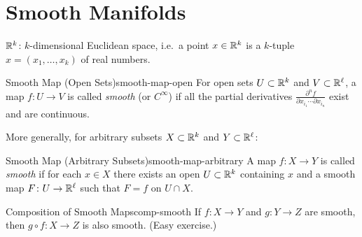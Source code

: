 
\section{Smooth Manifolds}

$\mathbb{R}^k$: $k$-dimensional Euclidean space, i.e.\ a point $x \in \mathbb{R}^k$ is a $k$-tuple $x = (x_1, \ldots, x_k)$ of real numbers.

\begin{definition}{Smooth Map (Open Sets)}{smooth-map-open}
    For open sets $U \subset \mathbb{R}^k$ and $V \subset \mathbb{R}^\ell$, a map $f \colon U \to V$ is called \emph{smooth} (or $C^\infty$) if all the partial derivatives $\frac{\partial^n f}{\partial x_{i_1} \cdots \partial x_{i_n}}$ exist and are continuous.
\end{definition}

More generally, for arbitrary subsets $X \subset \mathbb{R}^k$ and $Y \subset \mathbb{R}^\ell$:

\begin{definition}{Smooth Map (Arbitrary Subsets)}{smooth-map-arbitrary}
    A map $f \colon X \to Y$ is called \emph{smooth} if for each $x \in X$ there exists an open $U \subset \mathbb{R}^k$ containing $x$ and a smooth map $F \colon U \to \mathbb{R}^\ell$ such that $F = f$ on $U \cap X$.
\end{definition}

\begin{center}
\end{center}

\begin{proposition}{Composition of Smooth Maps}{comp-smooth}
    If $f \colon X \to Y$ and $g \colon Y \to Z$ are smooth, then $g \circ f \colon X \to Z$ is also smooth. \quad (Easy exercise.)
\end{proposition}

